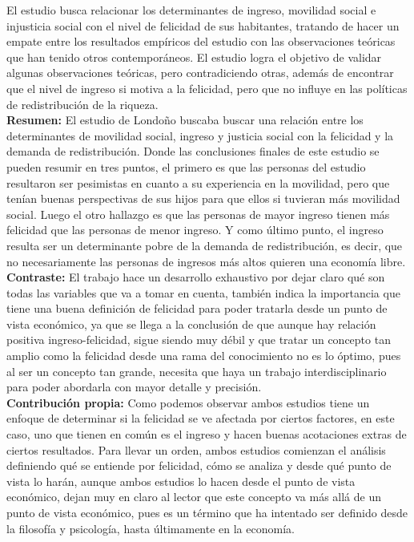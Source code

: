 El estudio busca relacionar los determinantes de ingreso, movilidad social e injusticia social con el nivel de felicidad de sus habitantes, tratando de hacer un empate entre los resultados empíricos del estudio con las observaciones teóricas que han tenido otros contemporáneos. El estudio logra el objetivo de validar algunas observaciones teóricas, pero contradiciendo otras, además de encontrar que el nivel de ingreso si motiva a la felicidad, pero que no influye en las políticas de redistribución de la riqueza. \\

\textbf{Resumen:} El estudio de Londoño buscaba buscar una relación entre los determinantes de movilidad social, ingreso y justicia social con la felicidad y la demanda de redistribución. Donde las conclusiones finales de este estudio se pueden resumir en tres puntos, el primero es que las personas del estudio resultaron ser pesimistas en cuanto a su experiencia en la movilidad, pero que tenían buenas perspectivas de sus hijos para que ellos si tuvieran más movilidad social. Luego el otro hallazgo es que las personas de mayor ingreso tienen más felicidad que las personas de menor ingreso. Y como último punto, el ingreso resulta ser un determinante pobre de la demanda de redistribución, es decir, que no necesariamente las personas de ingresos más altos quieren una economía libre. \\

\textbf{Contraste:} El trabajo hace un desarrollo exhaustivo por dejar claro qué son todas las variables que va a tomar en cuenta, también indica la importancia que tiene una buena definición de felicidad para poder tratarla desde un punto de vista económico, ya que se llega a la conclusión de que aunque hay relación positiva ingreso-felicidad, sigue siendo muy débil y que tratar un concepto tan amplio como la felicidad desde una rama del conocimiento no es lo óptimo, pues al ser un concepto tan grande, necesita que haya un trabajo interdisciplinario para poder abordarla con mayor detalle y precisión. \\

\textbf{Contribución propia:} Como podemos observar ambos estudios tiene un enfoque de determinar si la felicidad se ve afectada por ciertos factores, en este caso, uno que tienen en común es el ingreso y hacen buenas acotaciones extras de ciertos resultados. Para llevar un orden, ambos estudios comienzan el análisis definiendo qué se entiende por felicidad, cómo se analiza y desde qué punto de vista lo harán, aunque ambos estudios lo hacen desde el punto de vista económico, dejan muy en claro al lector que este concepto va más allá de un punto de vista económico, pues es un término que ha intentado ser definido desde la filosofía y psicología, hasta últimamente en la economía. \\

